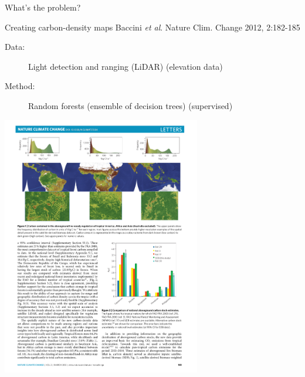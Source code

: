 \documentclass[pdf]{beamer}
\begin{document}
\begin{frame}{What's the problem?}
\begin{exampleblock}{Creating carbon-density maps \vskip-1mm{\tiny Baccini \textit{et al}. Nature Clim. Change 2012, 2:182-185}}
\begin{description}
	\item[Data:] Light detection and ranging (LiDAR) (elevation data)
	\item[Method:] Random forests (ensemble of decision trees) (supervised)
\end{description}
\begin{center}
	\includegraphics[width=0.65\textwidth]{baccini.pdf}
\end{center}
\end{exampleblock}
\end{frame}
\end{document}
